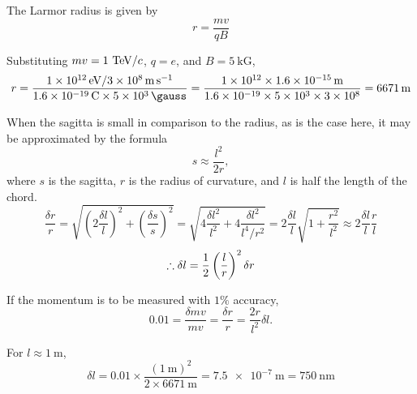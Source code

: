 The Larmor radius is given by
\begin{equation}
  r = \frac{mv}{qB}
\end{equation}

Substituting $mv = 1~\text{TeV}/c$, $q = e$, and $B = 5~\mathrm{kG}$,
\begin{equation}
  r = \frac{
    \SI{1e12}{\electronvolt} / \SI{3e8}{\meter\per\second}
  }{
    \SI{1.6e-19}{\coulomb}\times\SI{5e3}{\gauss}
  }
  = \frac{
    \num{1e12}\times\SI{1.6e-15}{\meter}
  }{
    \num{1.6e-19}\times\num{5e3}\times\num{3e8}
  }
  = \SI{6671}{\meter}
\end{equation}

When the sagitta is small in comparison to the radius, as is the case here, it may be approximated by the formula
\begin{equation}
  s \approx \frac{l^2}{2r},
\end{equation}
where $s$ is the sagitta, $r$ is the radius of curvature, and $l$ is half the length of the chord.
\begin{equation}
  \frac{\delta r}{r}
  = \sqrt{ \left(2\frac{\delta l}{l}\right)^2 + \left(\frac{\delta s}{s}\right)^2 }
  = \sqrt{ 4\frac{{\delta l}^2}{l^2} + 4\frac{{\delta l}^2}{l^4/r^2} }
  = 2\frac{\delta l}{l} \sqrt{ 1 + \frac{r^2}{l^2} }
  \approx 2\frac{\delta l}{l} \frac{r}{l}
\end{equation}
\begin{equation}
  \therefore \delta l = \frac{1}{2} \left(\frac{l}{r}\right)^2 \delta r
\end{equation}

If the momentum is to be measured with $1\%$ accuracy,
\begin{equation}
  0.01 = \frac{\delta mv}{mv} = \frac{\delta r}{r} = \frac{2r}{l^2} \delta l.
\end{equation}

For $l\approx\SI{1}{\meter}$,
\begin{equation}
  \delta l = 0.01 \times \frac{(\SI{1}{\meter})^2}{2\times\SI{6671}{\meter}}
  = \SI{7.5e-7}{\meter} = \boxed{ \SI{750}{\nano\meter} }
\end{equation}


